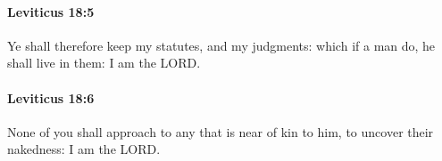 		\paragraph{Leviticus 18:5} %
			\label{LEVITICUS-18-5}

			Ye shall therefore keep my statutes, and my judgments: which if a man do, he shall live in them: I am the LORD.


		\paragraph{Leviticus 18:6} %
			\label{LEVITICUS-18-6}

			None of you shall approach to any that is near of kin to him, to uncover their nakedness: I am the LORD.


